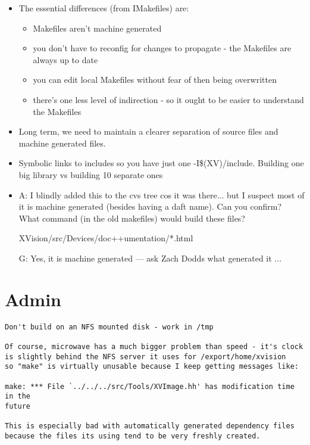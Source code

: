 \begin{itemize}
\item
The essential differences (from IMakefiles) are:
\begin{itemize}
\item
 Makefiles aren't machine generated
\item
 you don't have to reconfig for changes to propagate
  - the Makefiles are always up to date
\item
 you can edit local Makefiles without fear of then being overwritten
\item
  there's one less level of indirection - so it ought to be
  easier to understand the Makefiles
\end{itemize}

\item
Long term, we need to maintain a clearer separation of source files
 and machine generated files.

\item
Symbolic links to includes so you have just one -I\$(XV)/include.
Building one big library vs building 10 separate ones

\item
A:
   I blindly added this to the cvs tree cos it was there... but
   I suspect most of it is machine generated (besides having a daft name).
   Can you confirm?  What command (in the old makefiles) would build
   these files?

     XVision/src/Devices/doc++umentation/*.html

G:
   Yes, it is machine generated --- ask Zach Dodds what generated it  ...


\end{itemize}

\section{Admin}

\begin{verbatim}
Don't build on an NFS mounted disk - work in /tmp

Of course, microwave has a much bigger problem than speed - it's clock
is slightly behind the NFS server it uses for /export/home/xvision
so "make" is virtually unusable because I keep getting messages like:

make: *** File `../../../src/Tools/XVImage.hh' has modification time in the 
future

This is especially bad with automatically generated dependency files
because the files its using tend to be very freshly created.
\end{verbatim}



